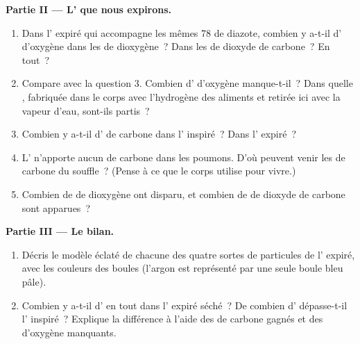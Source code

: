 \begin{problem}
\medskip
\noindent\textbf{Partie II --- L' que nous expirons.}
\begin{enumerate}[resume]
  \item Dans l' expiré qui accompagne les mêmes 78  de
        diazote, combien y a-t-il d' d'oxygène dans les 
        de dioxygène~? Dans les  de dioxyde de carbone~? En
        tout~?
  \item Compare avec la question 3. Combien d' d'oxygène
        manque-t-il~? Dans quelle , fabriquée dans le corps avec
        l'hydrogène des aliments et retirée ici avec la vapeur d'eau,
        sont-ils partis~?
  \item Combien y a-t-il d' de carbone dans l' inspiré~? Dans
        l' expiré~?
  \item L' n'apporte aucun  de carbone dans les poumons. D'où
        peuvent venir les  de carbone du souffle~? (Pense à ce que
        le corps utilise pour vivre.)
  \item Combien de  de dioxygène ont disparu, et combien de
         de dioxyde de carbone sont apparues~?
\end{enumerate}

\medskip
\noindent\textbf{Partie III --- Le bilan.}
\begin{enumerate}[resume]
  \item Décris le modèle éclaté de chacune des quatre sortes de
        particules de l' expiré, avec les couleurs des boules (l'argon
        est représenté par une seule boule bleu pâle).
  \item Combien y a-t-il d' en tout dans l' expiré séché~? De
        combien d' dépasse-t-il l' inspiré~? Explique la
        différence à l'aide des  de carbone gagnés et des 
        d'oxygène manquants.
\end{enumerate}
\end{problem}
